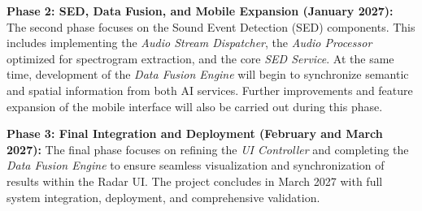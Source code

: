 \textbf{Phase 2: SED, Data Fusion, and Mobile Expansion (January 2027):}  
The second phase focuses on the Sound Event Detection (SED) components. 
This includes implementing the \textit{Audio Stream Dispatcher}, the \textit{Audio Processor} optimized for spectrogram extraction, and the core \textit{SED Service}. 
At the same time, development of the \textit{Data Fusion Engine} will begin to synchronize semantic and spatial information from both AI services. 
Further improvements and feature expansion of the mobile interface will also be carried out during this phase.

\textbf{Phase 3: Final Integration and Deployment (February and March 2027):}  
The final phase focuses on refining the \textit{UI Controller} and completing the \textit{Data Fusion Engine} to ensure seamless visualization and synchronization of results within the Radar UI. 
The project concludes in March 2027 with full system integration, deployment, and comprehensive validation.
